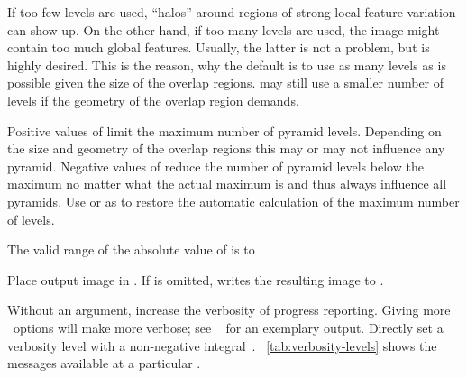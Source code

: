 \begin{codelist}
\begin{geeknote}
    If too few levels are used, ``halos'' around regions of strong local feature variation can
    show up.  On the other hand, if too many levels are used, the image might contain too much
    global features.  Usually, the latter is not a problem, but is highly desired.  This is the
    reason, why the default is to use as many levels as is possible given the size of the
    overlap regions.  \App{} may still use a smaller number of levels if the geometry of the
    overlap region demands.
  \end{geeknote}

  Positive values of  limit the maximum number of pyramid levels.  Depending on
  the size and geometry of the overlap regions this may or may not influence any pyramid.
  Negative values of  reduce the number of pyramid levels below the maximum no
  matter what the actual maximum is and thus always influence all pyramids.  Use 
  or  as  to restore the automatic calculation of the maximum
  number of levels.

  The valid range of the absolute value of  is 
  to .

  \label{opt:output}%
\item[\itempar{-o \metavar{FILE} \\ --output=\metavar{FILE}}]\itemend
  Place \appdid{} output image in .  If  is omitted, \App{}
  writes the resulting image to .


  \label{opt:verbose}%
\item[\itempar{-v \optional{\metavar{LEVEL}} \\ --verbose\optional{=\metavar{LEVEL}}}]\itemend
  Without an argument, increase the verbosity of progress reporting.  Giving more
  ~options will make \App{} more verbose; see
  \sectionName~ for an exemplary output.  Directly set a
  verbosity level with a non-negative integral~.
  \tableName~\ref{tab:verbosity-levels} shows the messages available at a particular
  .


\end{codelist}
